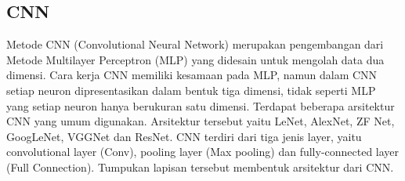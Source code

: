 \subsection{CNN}
\label{subsec:CNN}
Metode CNN (Convolutional Neural Network) merupakan pengembangan dari Metode
Multilayer Perceptron (MLP) yang didesain untuk mengolah data dua dimensi. Cara kerja CNN
memiliki kesamaan pada MLP, namun dalam CNN setiap neuron dipresentasikan dalam
bentuk tiga dimensi, tidak seperti MLP yang setiap neuron hanya berukuran satu dimensi.
Terdapat beberapa arsitektur CNN yang umum digunakan. Arsitektur tersebut yaitu
LeNet, AlexNet, ZF Net, GoogLeNet, VGGNet dan ResNet. CNN terdiri dari tiga jenis layer,
yaitu convolutional layer (Conv), pooling layer (Max pooling) dan fully-connected layer (Full
Connection). Tumpukan lapisan tersebut membentuk arsitektur dari CNN.\citep{DBLP:journals/corr/OSheaN15}
